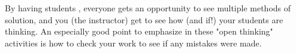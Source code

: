 By having students , everyone gets an opportunity to see multiple methods of solution, and you (the instructor) get to see how (and if!) your students are thinking.  An especially good point to emphasize in these "open thinking" activities is how to check your work to see if any mistakes were made.





